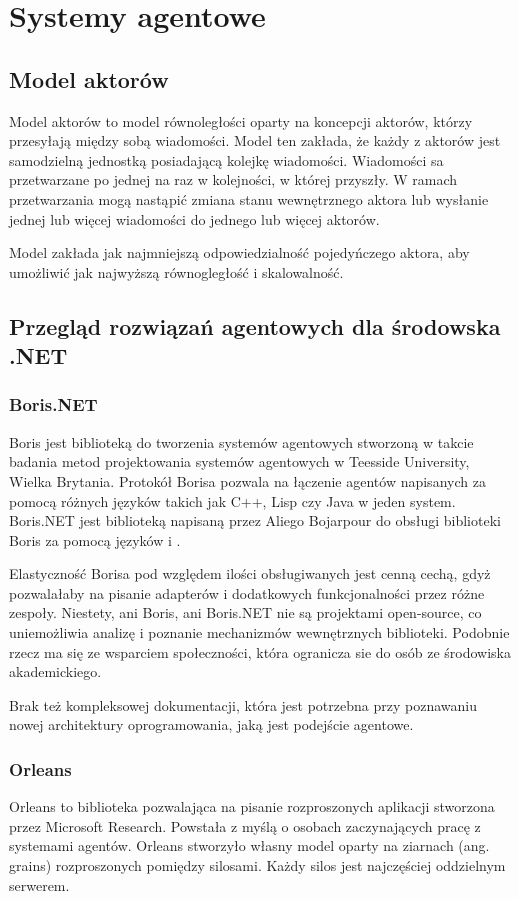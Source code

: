 \chapter{Systemy agentowe}
\section{Model aktorów}
Model aktorów to model równoległości oparty na koncepcji aktorów, którzy przesyłają między sobą wiadomości.
Model ten zakłada, że każdy z aktorów jest samodzielną jednostką posiadającą kolejkę wiadomości. Wiadomości sa przetwarzane po jednej na raz w kolejności, w której przyszły. W ramach przetwarzania mogą nastąpić zmiana stanu wewnętrznego aktora lub wysłanie jednej lub więcej wiadomości do jednego lub więcej aktorów. 

Model zakłada jak najmniejszą odpowiedzialność pojedyńczego aktora, aby umożliwić jak najwyższą równogległość i skalowalność.

\section{Przegląd rozwiązań agentowych dla środowska .NET}
\subsection{Boris.NET}
Boris jest biblioteką do tworzenia systemów agentowych stworzoną w takcie badania metod projektowania systemów agentowych w Teesside University, Wielka Brytania. Protokół Borisa pozwala na łączenie agentów napisanych za pomocą różnych języków takich jak C++, Lisp czy Java w jeden system. Boris.NET jest biblioteką napisaną przez Aliego Bojarpour do obsługi biblioteki Boris za pomocą języków \csh i \fsh. 

Elastyczność Borisa pod względem ilości obsługiwanych jest cenną cechą, gdyż pozwalałaby na pisanie adapterów i dodatkowych funkcjonalności przez różne zespoły. 
Niestety, ani Boris, ani Boris.NET nie są projektami open-source, co uniemożliwia analizę i poznanie mechanizmów wewnętrznych biblioteki. Podobnie rzecz ma się ze wsparciem społeczności, która ogranicza sie do osób ze środowiska akademickiego.

Brak też kompleksowej dokumentacji, która jest potrzebna przy poznawaniu nowej architektury oprogramowania, jaką jest podejście agentowe.

\subsection{Orleans}
Orleans to biblioteka pozwalająca na pisanie rozproszonych aplikacji stworzona przez Microsoft Research.
Powstała z myślą o osobach zaczynających pracę z systemami agentów. 
Orleans stworzyło własny model oparty na ziarnach (ang. grains) rozproszonych pomiędzy silosami. Każdy silos jest najczęściej oddzielnym serwerem.
  

